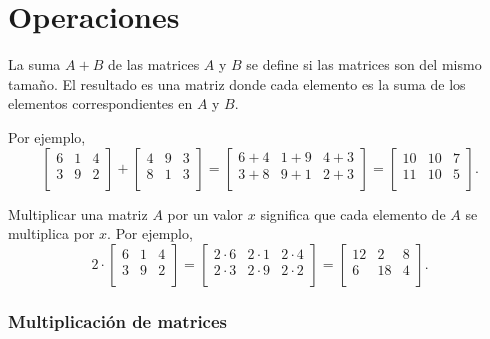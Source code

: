 \section{Operaciones}

La suma $A+B$ de las matrices $A$ y $B$
se define si las matrices son del mismo tamaño.
El resultado es una matriz donde cada elemento
es la suma de los elementos correspondientes
en $A$ y $B$.

Por ejemplo,
\[
 \begin{bmatrix}
  6 & 1 & 4 \\
  3 & 9 & 2 \\
 \end{bmatrix}
+
 \begin{bmatrix}
  4 & 9 & 3 \\
  8 & 1 & 3 \\
 \end{bmatrix}
=
 \begin{bmatrix}
  6+4 & 1+9 & 4+3 \\
  3+8 & 9+1 & 2+3 \\
 \end{bmatrix}
=
 \begin{bmatrix}
  10 & 10 & 7 \\
  11 & 10 & 5 \\
 \end{bmatrix}.
\]

Multiplicar una matriz $A$ por un valor $x$ significa
que cada elemento de $A$ se multiplica por $x$.
Por ejemplo,
\[
 2 \cdot \begin{bmatrix}
  6 & 1 & 4 \\
  3 & 9 & 2 \\
 \end{bmatrix}
=
 \begin{bmatrix}
  2 \cdot 6 & 2\cdot1 & 2\cdot4 \\
  2\cdot3 & 2\cdot9 & 2\cdot2 \\
 \end{bmatrix}
=
 \begin{bmatrix}
  12 & 2 & 8 \\
  6 & 18 & 4 \\
 \end{bmatrix}.
\]

\subsubsection{Multiplicación de matrices}


